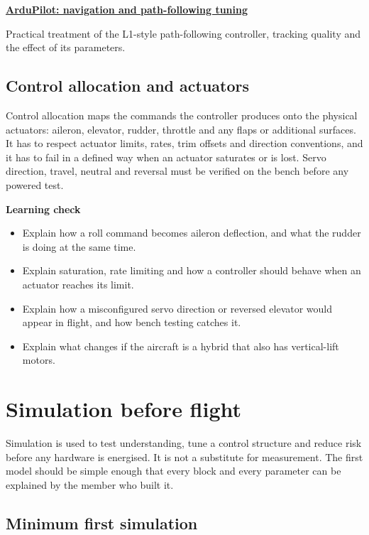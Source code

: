 \documentclass[11pt,a4paper]{article}
\newcommand{\Resource}[3]{%
  \begin{resourcebox}
    \href{#2}{\textbf{\color{DARESTeal}#1}}\par
    {\small #3}
  \end{resourcebox}
}
\begin{document}
\Resource
  {ArduPilot: navigation and path-following tuning}
  {https://ardupilot.org/plane/docs/navigation-tuning.html}
  {Practical treatment of the L1-style path-following controller, tracking quality and the effect of its parameters.}

\subsection{Control allocation and actuators}

Control allocation maps the commands the controller produces onto the physical
actuators: aileron, elevator, rudder, throttle and any flaps or additional
surfaces. It has to respect actuator limits, rates, trim offsets and direction
conventions, and it has to fail in a defined way when an actuator saturates or
is lost. Servo direction, travel, neutral and reversal must be verified on the
bench before any powered test.

\textbf{Learning check}
\begin{itemize}
  \item Explain how a roll command becomes aileron deflection, and what the rudder is doing at the same time.
  \item Explain saturation, rate limiting and how a controller should behave when an actuator reaches its limit.
  \item Explain how a misconfigured servo direction or reversed elevator would appear in flight, and how bench testing catches it.
  \item Explain what changes if the aircraft is a hybrid that also has vertical-lift motors.
\end{itemize}

\section{Simulation before flight}

Simulation is used to test understanding, tune a control structure and reduce
risk before any hardware is energised. It is not a substitute for measurement.
The first model should be simple enough that every block and every parameter
can be explained by the member who built it.

\subsection{Minimum first simulation}
\end{document}
